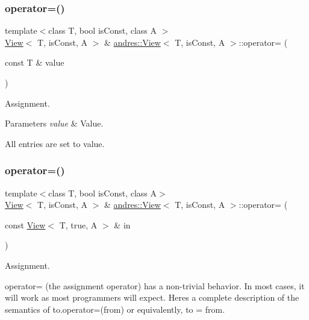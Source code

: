 \subsubsection{\texorpdfstring{operator=()}{operator=()}\hspace{0.1cm}{\footnotesize\ttfamily [1/5]}}
{\footnotesize\ttfamily template$<$class T, bool is\+Const, class A $>$ \\
\hyperlink{classandres_1_1View}{View}$<$ T, is\+Const, A $>$ \& \hyperlink{classandres_1_1View}{andres\+::\+View}$<$ T, is\+Const, A $>$\+::operator= (\begin{DoxyParamCaption}\item[{const T \&}]{value }\end{DoxyParamCaption})\hspace{0.3cm}{\ttfamily [inline]}}

Assignment.


\begin{DoxyParams}{Parameters}
{\em value} & Value.\\
\hline
\end{DoxyParams}
All entries are set to value. \mbox{\label{classandres_1_1View_a604e4fe802e5d712a4e99ae44e496a3f}} 
\subsubsection{\texorpdfstring{operator=()}{operator=()}\hspace{0.1cm}{\footnotesize\ttfamily [2/5]}}
{\footnotesize\ttfamily template$<$class T, bool is\+Const, class A$>$ \\
\hyperlink{classandres_1_1View}{View}$<$ T, is\+Const, A $>$ \& \hyperlink{classandres_1_1View}{andres\+::\+View}$<$ T, is\+Const, A $>$\+::operator= (\begin{DoxyParamCaption}\item[{const \hyperlink{classandres_1_1View}{View}$<$ T, true, A $>$ \&}]{in }\end{DoxyParamCaption})\hspace{0.3cm}{\ttfamily [inline]}}

Assignment.

operator= (the assignment operator) has a non-\/trivial behavior. In most cases, it will work as most programmers will expect. Here\textquotesingle{}s a complete description of the semantics of to.\+operator=(from) or equivalently, to = from.

